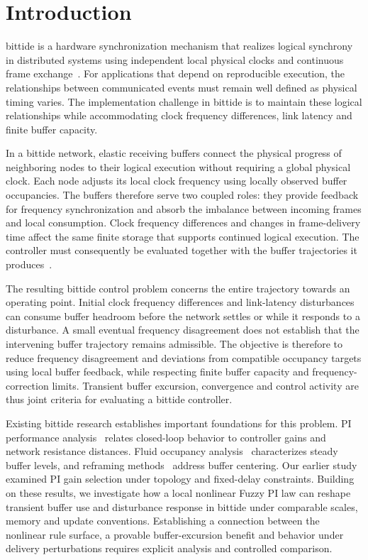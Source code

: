 \section{Introduction}
\label{sec:introduction}

bittide is a hardware synchronization mechanism that realizes logical synchrony in distributed systems using independent local physical clocks and continuous frame exchange~\cite{lall2024logicalSynchrony}. For applications that depend on reproducible execution, the relationships between communicated events must remain well defined as physical timing varies. The implementation challenge in bittide is to maintain these logical relationships while accommodating clock frequency differences, link latency and finite buffer capacity.

In a bittide network, elastic receiving buffers connect the physical progress of neighboring nodes to their logical execution without requiring a global physical clock. Each node adjusts its local clock frequency using locally observed buffer occupancies. The buffers therefore serve two coupled roles: they provide feedback for frequency synchronization and absorb the imbalance between incoming frames and local consumption. Clock frequency differences and changes in frame-delivery time affect the same finite storage that supports continued logical execution. The controller must consequently be evaluated together with the buffer trajectories it produces~\cite{lall2024logicalSynchrony}.

The resulting bittide control problem concerns the entire trajectory towards an operating point. Initial clock frequency differences and link-latency disturbances can consume buffer headroom before the network settles or while it responds to a disturbance. A small eventual frequency disagreement does not establish that the intervening buffer trajectory remains admissible. The objective is therefore to reduce frequency disagreement and deviations from compatible occupancy targets using local buffer feedback, while respecting finite buffer capacity and frequency-correction limits. Transient buffer excursion, convergence and control activity are thus joint criteria for evaluating a bittide controller.

Existing bittide research establishes important foundations for this problem. PI performance analysis~\cite{lall2022resistance} relates closed-loop behavior to controller gains and network resistance distances. Fluid occupancy analysis~\cite{lall2024bufferOccupancy} characterizes steady buffer levels, and reframing methods~\cite{lall2023bufferCentering} address buffer centering. Our earlier study examined PI gain selection under topology and fixed-delay constraints. Building on these results, we investigate how a local nonlinear Fuzzy PI law can reshape transient buffer use and disturbance response in bittide under comparable scales, memory and update conventions. Establishing a connection between the nonlinear rule surface, a provable buffer-excursion benefit and behavior under delivery perturbations requires explicit analysis and controlled comparison.

